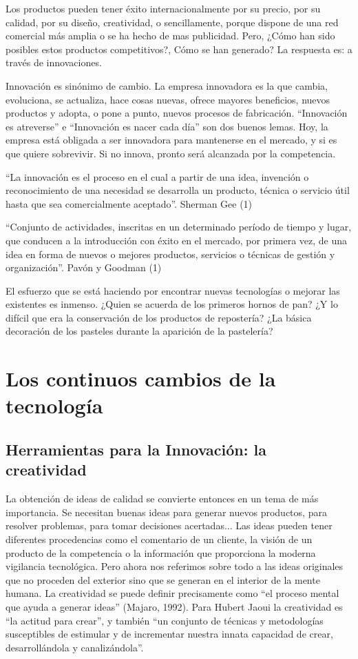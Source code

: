 \documentclass{bmcart}
\begin{document}
Los productos pueden tener éxito internacionalmente por su precio, por su calidad, por su diseño, creatividad, o sencillamente, porque dispone de una red comercial más amplia o se ha hecho de mas publicidad. Pero, ¿Cómo han sido posibles estos productos competitivos?, Cómo se han generado? La respuesta es: a través de innovaciones.

Innovación es sinónimo de cambio. La empresa innovadora es la que cambia, evoluciona, se actualiza, hace cosas nuevas, ofrece mayores beneficios, nuevos productos y adopta, o pone a punto, nuevos procesos de fabricación. “Innovación es atreverse” e “Innovación es nacer cada día” son dos buenos lemas. Hoy, la empresa está obligada a ser innovadora para mantenerse en el mercado, y si es que quiere sobrevivir. Si no innova, pronto será alcanzada por la competencia.

“La innovación es el proceso en el cual a partir de una idea, invención o reconocimiento de una necesidad se desarrolla un producto, técnica o servicio útil hasta que sea comercialmente aceptado”. Sherman Gee (1)

“Conjunto de actividades, inscritas en un determinado período de tiempo y lugar, que conducen a la introducción con éxito en el mercado, por primera vez, de una idea en forma de nuevos o mejores productos, servicios o técnicas de gestión y organización”. Pavón y Goodman (1)

El esfuerzo que se está haciendo por encontrar nuevas tecnologías o mejorar las existentes es inmenso. ¿Quien se acuerda de los primeros hornos de pan? ¿Y lo difícil que era la conservación de los productos de repostería? ¿La básica decoración de los pasteles durante la aparición de la pastelería? 

\section{Los continuos cambios de la tecnología}
\subsection{Herramientas para la Innovación: la creatividad}

La obtención de ideas de calidad se convierte entonces en un tema de más importancia. Se necesitan buenas ideas para generar nuevos productos, para resolver problemas, para tomar decisiones acertadas... Las ideas pueden tener diferentes procedencias como el comentario de un cliente, la visión de un producto de la competencia o la información que proporciona la moderna vigilancia tecnológica. Pero ahora nos referimos sobre todo a las ideas originales que no proceden del exterior sino que se generan en el interior de la mente humana. La creatividad se puede definir precisamente como “el proceso mental que ayuda a generar ideas” (Majaro, 1992). Para Hubert Jaoui la creatividad es “la actitud para crear”, y también “un conjunto de técnicas y metodologías susceptibles de estimular y de incrementar nuestra innata capacidad de crear, desarrollándola y canalizándola”.
\end{document}
